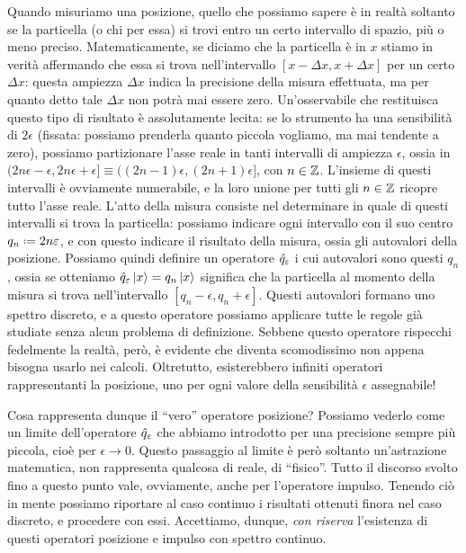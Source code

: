Quando misuriamo una posizione, quello che possiamo sapere è in realtà soltanto se la particella (o chi per essa) si trovi entro un certo intervallo di spazio, più o meno preciso.
Matematicamente, se diciamo che la particella è in $x$ stiamo in verità affermando che essa si trova nell'intervallo $[x-\Delta x, x+\Delta x]$ per un certo $\Delta x$: questa ampiezza $\Delta x$ indica la precisione della misura effettuata, ma per quanto detto tale $\Delta x$ non potrà mai essere zero.
Un'osservabile che restituisca questo tipo di risultato è assolutamente lecita: se lo strumento ha una sensibilità di $2\epsilon$ (fissata: possiamo prenderla quanto piccola vogliamo, ma mai tendente a zero), possiamo partizionare l'asse reale in tanti intervalli di ampiezza $\epsilon$, ossia in $(2n\epsilon-\epsilon,2n\epsilon+\epsilon]\equiv \big((2n-1)\epsilon,(2n+1)\epsilon\big]$, con $n\in\mathbb{Z}$.
L'insieme di questi intervalli è ovviamente numerabile, e la loro unione per tutti gli $n\in\mathbb{Z}$ ricopre tutto l'asse reale.
L'atto della misura consiste nel determinare in quale di questi intervalli si trova la particella: possiamo indicare ogni intervallo con il suo centro $q_n\defeq 2n\epsilon$, e con questo indicare il risultato della misura, ossia gli autovalori della posizione.
Possiamo quindi definire un operatore $\hat{q}_\varepsilon$ i cui autovalori sono questi $q_n$, ossia se otteniamo $\hat{q}_\varepsilon\left|{x}\right\rangle=q_n\left|{x}\right\rangle$ significa che la particella al momento della misura si trova nell'intervallo $[q_n-\epsilon,q_n+\epsilon]$.
Questi autovalori formano uno spettro discreto, e a questo operatore possiamo applicare tutte le regole già studiate senza alcun problema di definizione.
Sebbene questo operatore rispecchi fedelmente la realtà, però, è evidente che diventa scomodissimo non appena bisogna usarlo nei calcoli.
Oltretutto, esisterebbero infiniti operatori rappresentanti la posizione, uno per ogni valore della sensibilità $\epsilon$ assegnabile!

Cosa rappresenta dunque il ``vero'' operatore posizione?
Possiamo vederlo come un limite dell'operatore $\hat{q}_\varepsilon$ che abbiamo introdotto per una precisione sempre più piccola, cioè per $\epsilon\to 0$.
Questo passaggio al limite è però soltanto un'astrazione matematica, non rappresenta qualcosa di reale, di ``fisico''.
Tutto il discorso svolto fino a questo punto vale, ovviamente, anche per l'operatore impulso.
Tenendo ciò in mente possiamo riportare al caso continuo i risultati ottenuti finora nel caso discreto, e procedere con essi.
Accettiamo, dunque, \emph{con riserva} l'esistenza di questi operatori posizione e impulso con spettro continuo.

